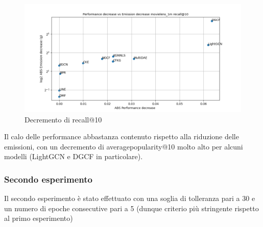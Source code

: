 \begin{figure}[H]
    \centering
     \includegraphics[width=\textwidth]{images/decrement_recall@10_movielens_1m_40_5.png}
    \caption{Decremento di recall@10}
\end{figure}
\noindent Il calo delle performance abbastanza contenuto rispetto alla riduzione delle emissioni, con un decremento di averagepopularity@10 molto alto per alcuni modelli (LightGCN e DGCF in particolare).


\subsubsection{Secondo esperimento}
Il secondo esperimento è stato effettuato con una soglia di tolleranza pari a 30 e un numero di epoche consecutive pari a 5 (dunque criterio più stringente rispetto al primo esperimento)

